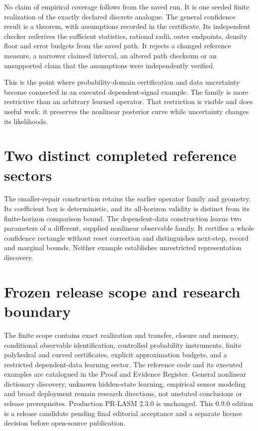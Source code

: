 No claim of empirical coverage follows from the saved run. It is one
seeded finite realization of the exactly declared discrete analogue. The
general confidence result is a theorem, with assumptions recorded in the
certificate. Its independent checker rederives the sufficient
statistics, rational radii, outer endpoints, density floor and error
budgets from the saved path. It rejects a changed reference measure, a
narrower claimed interval, an altered path checksum or an unsupported
claim that the assumptions were independently verified.

This is the point where probability-domain certification and data
uncertainty become connected in an executed dependent-signal example.
The family is more restrictive than an arbitrary learned operator. That
restriction is visible and does useful work: it preserves the nonlinear
posterior curve while uncertainty changes its likelihoods.

\section{Two distinct completed reference sectors}\label{LSM:two-distinct-completed-reference-sectors}

The smaller-repair construction retains the earlier operator family and
geometry. Its coefficient box is deterministic, and its all-horizon
validity is distinct from its finite-horizon comparison bound. The
dependent-data construction learns two parameters of a different,
supplied nonlinear observable family. It certifies a whole confidence
rectangle without reset correction and distinguishes next-step, record
and marginal bounds. Neither example establishes unrestricted
representation discovery.

\section{Frozen release scope and research boundary}\label{LSM:frozen-release-scope-and-research-boundary}

The finite scope contains exact realization and transfer, closure and
memory, conditional observable identification, controlled probability
instruments, finite polyhedral and curved certificates, explicit
approximation budgets, and a restricted dependent-data learning sector.
The reference code and its executed examples are catalogued in the Proof
and Evidence Register. General nonlinear dictionary discovery, unknown
hidden-state learning, empirical sensor modeling and broad deployment
remain research directions, not unstated conclusions or release
prerequisites. Production PR-LASM 2.3.0 is unchanged. This 0.9.0 edition
is a release candidate pending final editorial acceptance and a separate
license decision before open-source publication.


\begingroup
\small\raggedright

